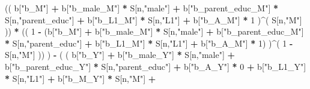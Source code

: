 \documentclass[
]{book}
\newenvironment{Shaded}{\begin{snugshade}}{\end{snugshade}}
\newcommand{\DecValTok}[1]{\textcolor[rgb]{0.00,0.00,0.81}{#1}}
\newcommand{\NormalTok}[1]{#1}
\newcommand{\SpecialCharTok}[1]{\textcolor[rgb]{0.81,0.36,0.00}{\textbf{#1}}}
\newcommand{\StringTok}[1]{\textcolor[rgb]{0.31,0.60,0.02}{#1}}
\begin{document}
\begin{Shaded}
\begin{Highlighting}[]
\NormalTok{                    (( b[}\StringTok{"b\_M"}\NormalTok{] }\SpecialCharTok{+} 
\NormalTok{                           b[}\StringTok{"b\_male\_M"}\NormalTok{] }\SpecialCharTok{*}\NormalTok{ S[n,}\StringTok{"male"}\NormalTok{] }\SpecialCharTok{+} 
\NormalTok{                           b[}\StringTok{"b\_parent\_educ\_M"}\NormalTok{] }\SpecialCharTok{*}\NormalTok{ S[n,}\StringTok{"parent\_educ"}\NormalTok{] }\SpecialCharTok{+} 
\NormalTok{                           b[}\StringTok{"b\_L1\_M"}\NormalTok{] }\SpecialCharTok{*}\NormalTok{ S[n,}\StringTok{"L1"}\NormalTok{] }\SpecialCharTok{+}
\NormalTok{                           b[}\StringTok{"b\_A\_M"}\NormalTok{] }\SpecialCharTok{*} \DecValTok{1}\NormalTok{ )}\SpecialCharTok{\^{}}\NormalTok{( S[n,}\StringTok{"M"}\NormalTok{] )) }\SpecialCharTok{*}
\NormalTok{                    (( }\DecValTok{1} \SpecialCharTok{{-}}\NormalTok{ (b[}\StringTok{"b\_M"}\NormalTok{] }\SpecialCharTok{+} 
\NormalTok{                              b[}\StringTok{"b\_male\_M"}\NormalTok{] }\SpecialCharTok{*}\NormalTok{ S[n,}\StringTok{"male"}\NormalTok{] }\SpecialCharTok{+} 
\NormalTok{                              b[}\StringTok{"b\_parent\_educ\_M"}\NormalTok{] }\SpecialCharTok{*}\NormalTok{ S[n,}\StringTok{"parent\_educ"}\NormalTok{] }\SpecialCharTok{+} 
\NormalTok{                              b[}\StringTok{"b\_L1\_M"}\NormalTok{] }\SpecialCharTok{*}\NormalTok{ S[n,}\StringTok{"L1"}\NormalTok{] }\SpecialCharTok{+}
\NormalTok{                              b[}\StringTok{"b\_A\_M"}\NormalTok{] }\SpecialCharTok{*} \DecValTok{1}\NormalTok{) )}\SpecialCharTok{\^{}}\NormalTok{( }\DecValTok{1} \SpecialCharTok{{-}}\NormalTok{ S[n,}\StringTok{"M"}\NormalTok{] )) ) }\SpecialCharTok{{-}} 
\NormalTok{                    ( ( b[}\StringTok{"b\_Y"}\NormalTok{] }\SpecialCharTok{+} 
\NormalTok{                          b[}\StringTok{"b\_male\_Y"}\NormalTok{] }\SpecialCharTok{*}\NormalTok{ S[n,}\StringTok{"male"}\NormalTok{] }\SpecialCharTok{+} 
\NormalTok{                          b[}\StringTok{"b\_parent\_educ\_Y"}\NormalTok{] }\SpecialCharTok{*}\NormalTok{ S[n,}\StringTok{"parent\_educ"}\NormalTok{] }\SpecialCharTok{+} 
\NormalTok{                          b[}\StringTok{"b\_A\_Y"}\NormalTok{] }\SpecialCharTok{*} \DecValTok{0} \SpecialCharTok{+} 
\NormalTok{                          b[}\StringTok{"b\_L1\_Y"}\NormalTok{] }\SpecialCharTok{*}\NormalTok{ S[n,}\StringTok{"L1"}\NormalTok{] }\SpecialCharTok{+}
\NormalTok{                          b[}\StringTok{"b\_M\_Y"}\NormalTok{] }\SpecialCharTok{*}\NormalTok{ S[n,}\StringTok{"M"}\NormalTok{] }\SpecialCharTok{+}

\end{Highlighting}
\end{Shaded}
\end{document}
